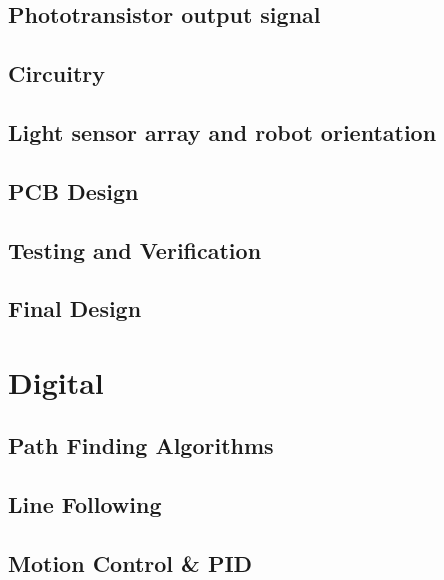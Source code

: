 \documentclass{article}
\begin{document}
\subsection{Phototransistor output signal}

\subsection{Circuitry}

\subsection{Light sensor array and robot orientation}

\subsection{PCB Design}

\subsection{Testing and Verification}

\subsection{Final Design}


\section{Digital}

\subsection{Path Finding Algorithms}

\subsection{Line Following}

\subsection{Motion Control \& PID}
\end{document}
